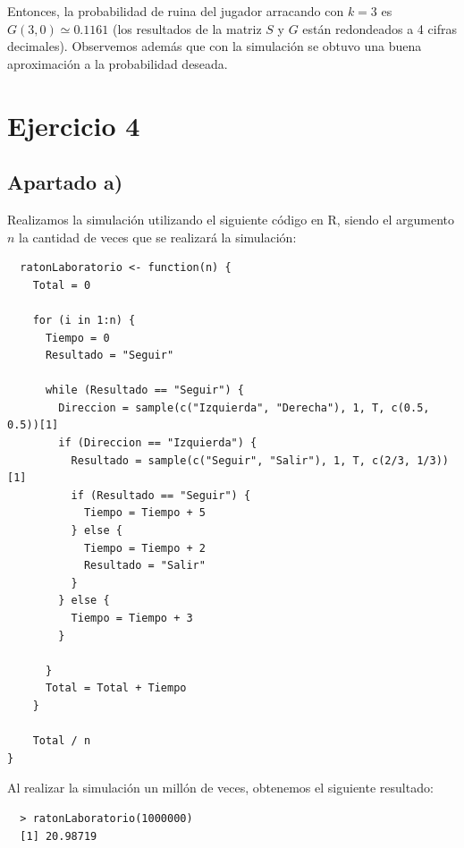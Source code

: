 \documentclass[11pt]{article}
\begin{document}
Entonces, la probabilidad de ruina del jugador arracando con $ k = 3 $ es $ G(3, 0) \simeq 0.1161 $ (los resultados de la 
matriz $S$ y $G$ están redondeados a 4 cifras decimales). Observemos además que con la simulación
se obtuvo una buena aproximación a la probabilidad deseada.


\section{Ejercicio 4}

\subsection*{Apartado a)}

Realizamos la simulación utilizando el siguiente código en R, siendo el 
argumento $n$ la cantidad de veces que se realizará la simulación:

\begin{verbatim}
  ratonLaboratorio <- function(n) {
    Total = 0

    for (i in 1:n) {
      Tiempo = 0
      Resultado = "Seguir"

      while (Resultado == "Seguir") {
        Direccion = sample(c("Izquierda", "Derecha"), 1, T, c(0.5, 0.5))[1]
        if (Direccion == "Izquierda") {
          Resultado = sample(c("Seguir", "Salir"), 1, T, c(2/3, 1/3))[1]
          if (Resultado == "Seguir") {
            Tiempo = Tiempo + 5
          } else {
            Tiempo = Tiempo + 2
            Resultado = "Salir"
          }
        } else {
          Tiempo = Tiempo + 3
        }

      }
      Total = Total + Tiempo
    }
  
    Total / n
}
\end{verbatim}

Al realizar la simulación un millón de veces, obtenemos el siguiente resultado:

\begin{verbatim}
  > ratonLaboratorio(1000000)
  [1] 20.98719
\end{verbatim}

\end{document}
